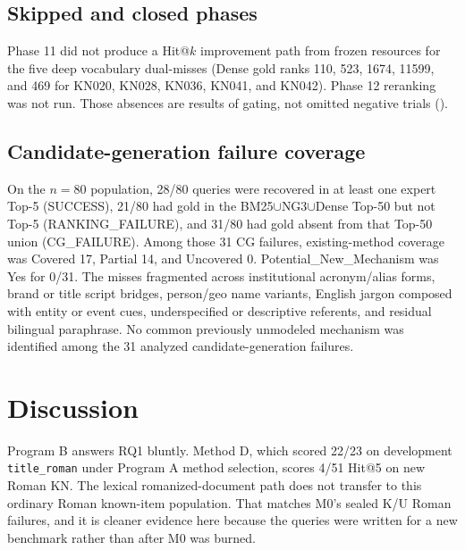 \documentclass[10pt,letterpaper]{article}
\begin{document}
\subsection*{Skipped and closed phases}

Phase 11 did not produce a Hit@$k$ improvement path from frozen resources for the five deep vocabulary dual-misses (Dense gold ranks 110, 523, 1674, 11599, and 469 for KN020, KN028, KN036, KN041, and KN042). Phase 12 reranking was not run. Those absences are results of gating, not omitted negative trials ().

\subsection*{Candidate-generation failure coverage}

On the $n = 80$ population, 28/80 queries were recovered in at least one expert Top-5 (SUCCESS), 21/80 had gold in the BM25$\cup$NG3$\cup$Dense Top-50 but not Top-5 (RANKING\_FAILURE), and 31/80 had gold absent from that Top-50 union (CG\_FAILURE). Among those 31 CG failures, existing-method coverage was Covered 17, Partial 14, and Uncovered 0. Potential\_New\_Mechanism was Yes for 0/31. The misses fragmented across institutional acronym/alias forms, brand or title script bridges, person/geo name variants, English jargon composed with entity or event cues, underspecified or descriptive referents, and residual bilingual paraphrase. No common previously unmodeled mechanism was identified among the 31 analyzed candidate-generation failures.

\section*{Discussion}
Program B answers RQ1 bluntly. Method D, which scored 22/23 on development \texttt{title\_roman} under Program A method selection, scores 4/51 Hit@5 on new Roman KN. The lexical romanized-document path does not transfer to this ordinary Roman known-item population. That matches M0's sealed K/U Roman failures, and it is cleaner evidence here because the queries were written for a new benchmark rather than after M0 was burned.
\end{document}
